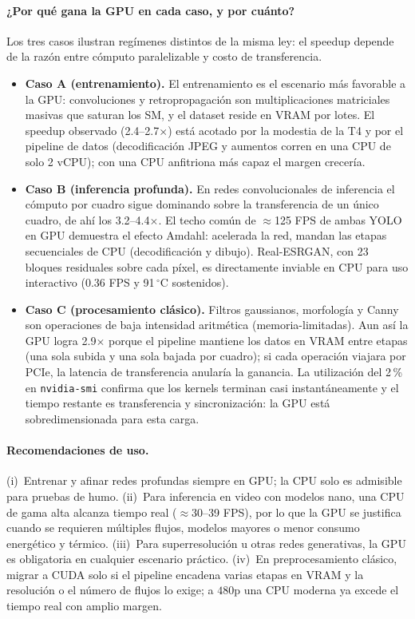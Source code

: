 \paragraph{¿Por qué gana la GPU en cada caso, y por cuánto?}
Los tres casos ilustran regímenes distintos de la misma ley: el speedup depende
de la razón entre cómputo paralelizable y costo de transferencia.

\begin{itemize}
  \item \textbf{Caso A (entrenamiento).} El entrenamiento es el escenario más
        favorable a la GPU: convoluciones y retropropagación son
        multiplicaciones matriciales masivas que saturan los SM, y el dataset
        reside en VRAM por lotes. El speedup observado (2.4--2.7$\times$)
        está acotado por la modestia de la T4 y por el pipeline de datos
        (decodificación JPEG y aumentos corren en una CPU de solo 2 vCPU); con
        una CPU anfitriona más capaz el margen crecería.
  \item \textbf{Caso B (inferencia profunda).} En redes convolucionales de
        inferencia el cómputo por cuadro sigue dominando sobre la
        transferencia de un único cuadro, de ahí los 3.2--4.4$\times$. El
        techo común de $\approx$125 FPS de ambas YOLO en GPU demuestra el
        efecto Amdahl: acelerada la red, mandan las etapas secuenciales de CPU
        (decodificación y dibujo). Real-ESRGAN, con 23 bloques residuales
        sobre cada píxel, es directamente inviable en CPU para uso interactivo
        (0.36 FPS y 91\,$^{\circ}$C sostenidos).
  \item \textbf{Caso C (procesamiento clásico).} Filtros gaussianos,
        morfología y Canny son operaciones de baja intensidad aritmética
        (memoria-limitadas). Aun así la GPU logra 2.9$\times$ porque el
        pipeline mantiene los datos en VRAM entre etapas (una sola subida y
        una sola bajada por cuadro); si cada operación viajara por PCIe, la
        latencia de transferencia anularía la ganancia. La utilización del
        2\,\% en \texttt{nvidia-smi} confirma que los kernels terminan casi
        instantáneamente y el tiempo restante es transferencia y
        sincronización: la GPU está sobredimensionada para esta carga.
\end{itemize}

\paragraph{Recomendaciones de uso.}
(i)~Entrenar y afinar redes profundas siempre en GPU; la CPU solo es admisible
para pruebas de humo. (ii)~Para inferencia en video con modelos nano, una CPU
de gama alta alcanza tiempo real ($\approx$30--39 FPS), por lo que la GPU se
justifica cuando se requieren múltiples flujos, modelos mayores o menor consumo
energético y térmico. (iii)~Para superresolución u otras redes generativas, la
GPU es obligatoria en cualquier escenario práctico. (iv)~En preprocesamiento
clásico, migrar a CUDA solo si el pipeline encadena varias etapas en VRAM y la
resolución o el número de flujos lo exige; a $480$p una CPU moderna ya excede
el tiempo real con amplio margen.
